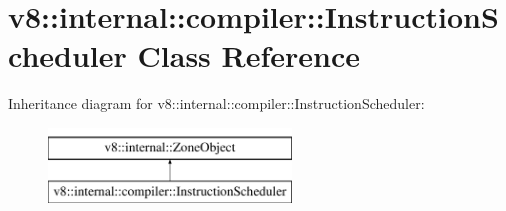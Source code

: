 \hypertarget{classv8_1_1internal_1_1compiler_1_1InstructionScheduler}{}\section{v8\+:\+:internal\+:\+:compiler\+:\+:Instruction\+Scheduler Class Reference}
\label{classv8_1_1internal_1_1compiler_1_1InstructionScheduler}
Inheritance diagram for v8\+:\+:internal\+:\+:compiler\+:\+:Instruction\+Scheduler\+:\begin{figure}[H]
\begin{center}
\leavevmode
\includegraphics[height=2.000000cm]{classv8_1_1internal_1_1compiler_1_1InstructionScheduler}
\end{center}
\end{figure}
